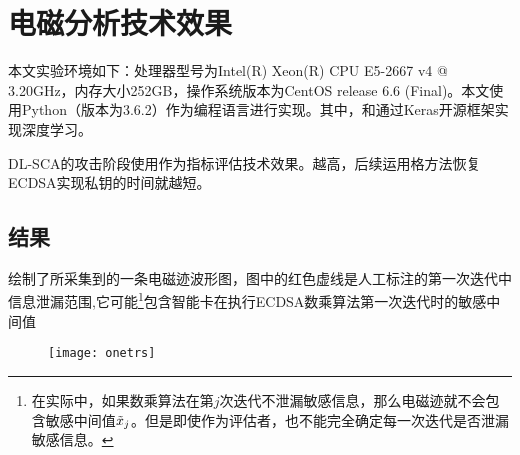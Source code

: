 {{	\section{电磁分析技术效果}\label{sec:ecdsaresult}
	本文实验环境如下：处理器型号为Intel(R) Xeon(R) CPU E5-2667 v4 @ 3.20GHz，内存大小252GB，操作系统版本为CentOS release 6.6 (Final)。本文使用Python（版本为3.6.2）作为编程语言进行实现。其中，\shujuzengqiang 和\jiashejianyanguji 通过Keras开源框架实现深度学习。
	
	DL-SCA的攻击阶段使用\zyx 作为指标评估技术效果。\zyx 越高，后续运用格方法恢复ECDSA实现私钥的时间就越短。
	
	\subsection{\yuchuli 结果}
	
	绘制了所采集到的一条电磁迹波形图，图中的红色虚线是人工标注的第一次迭代中信息泄漏范围,它可能\footnote{在实际中，如果数乘算法在第$j$次迭代不泄漏敏感信息，那么电磁迹就不会包含敏感中间值$\tilde {x}_j$。但是即使作为评估者，也不能完全确定每一次迭代是否泄漏敏感信息。}包含智能卡在执行ECDSA数乘算法第一次迭代时的敏感中间值%
	
	\begin{figure}[!h]
		\begin{center}
			\texttt{[image: onetrs]}
			\label{fig:onetrs}
		\end{center}
	\end{figure}
	
}}
